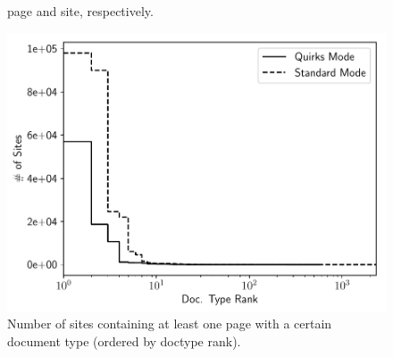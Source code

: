 \begin{figure}[t]
\begin{minipage}{.32\textwidth}
{             page and site, respectively.}
    \label{rpo:fig:analysis:relative_stylesheets}
\end{minipage}
\hfill
\begin{minipage}{.32\textwidth}
    \includegraphics[width=1\textwidth,height=.8\textwidth]{rpo/figures/doctypes_rank_sites}
    \caption{Number of sites containing at least one page with a certain
             document type (ordered by doctype rank).}
    \label{rpo:fig:analysis:doctypes_rank_sites}
\end{minipage}
\end{figure}
